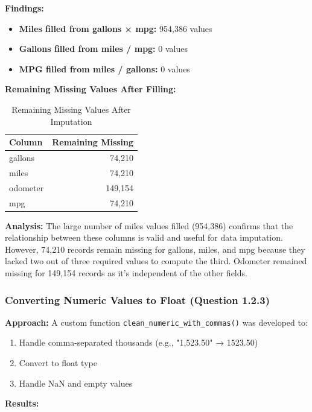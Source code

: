 \documentclass{article}
\begin{document}
\textbf{Findings:}
\begin{itemize}
    \item \textbf{Miles filled from gallons × mpg:} 954,386 values
    \item \textbf{Gallons filled from miles / mpg:} 0 values
    \item \textbf{MPG filled from miles / gallons:} 0 values
\end{itemize}

\textbf{Remaining Missing Values After Filling:}

\begin{table}[H]
    \centering
    \caption{Remaining Missing Values After Imputation}
    \begin{tabular}{l r}
        \toprule
        \textbf{Column} & \textbf{Remaining Missing} \\
        \midrule
        gallons & 74,210 \\
        miles & 74,210 \\
        odometer & 149,154 \\
        mpg & 74,210 \\
        \bottomrule
    \end{tabular}
    \label{tab:remaining_missing}
\end{table}

\textbf{Analysis:}
The large number of miles values filled (954,386) confirms that the relationship between these columns is valid and useful for data imputation. However, 74,210 records remain missing for gallons, miles, and mpg because they lacked two out of three required values to compute the third. Odometer remained missing for 149,154 records as it's independent of the other fields.

\subsubsection{Converting Numeric Values to Float (Question 1.2.3)}

\textbf{Approach:}
A custom function \texttt{clean\_numeric\_with\_commas()} was developed to:
\begin{enumerate}
    \item Handle comma-separated thousands (e.g., "1,523.50" → 1523.50)
    \item Convert to float type
    \item Handle NaN and empty values
\end{enumerate}

\textbf{Results:}
\end{document}
